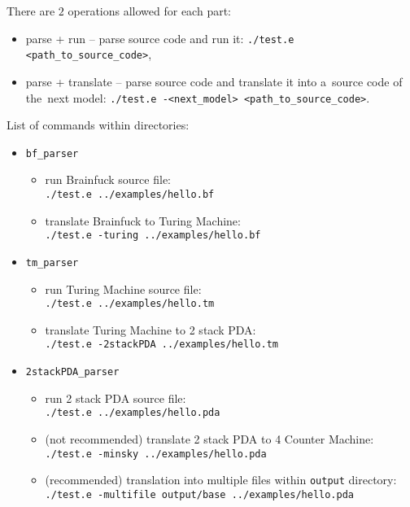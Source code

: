 \documentclass[english,shortabstract,mgr]{iithesis}
\begin{document}
There are $2$ operations allowed for each part:
\begin{itemize}
  \item parse + run -- parse source code and run it: \texttt{./test.e <path\_to\_source\_code>},
  \item parse + translate -- parse source code and translate it into a~source code
      of the~next model: \texttt{./test.e -<next\_model> <path\_to\_source\_code>}.
\end{itemize}

List of commands within directories:
\begin{itemize}
  \item \texttt{bf\_parser}
    \begin{itemize}
      \item run Brainfuck source file: \\ \texttt{./test.e ../examples/hello.bf}
      \item translate Brainfuck to Turing Machine: \\ \texttt{./test.e -turing ../examples/hello.bf}
    \end{itemize}
  \item \texttt{tm\_parser}
    \begin{itemize}
      \item run Turing Machine source file: \\ \texttt{./test.e ../examples/hello.tm}
      \item translate Turing Machine to 2 stack PDA: \\ \texttt{./test.e -2stackPDA ../examples/hello.tm}
    \end{itemize}
  \item \texttt{2stackPDA\_parser}
    \begin{itemize}
      \item run 2 stack PDA source file: \\ \texttt{./test.e ../examples/hello.pda}
      \item (not recommended) translate 2 stack PDA to 4 Counter Machine: \\ \texttt{./test.e -minsky ../examples/hello.pda}
      \item (recommended) translation into multiple files within \texttt{output}
        directory: \\ \texttt{./test.e -multifile output/base ../examples/hello.pda}


\end{itemize}
\end{itemize}
\end{document}
